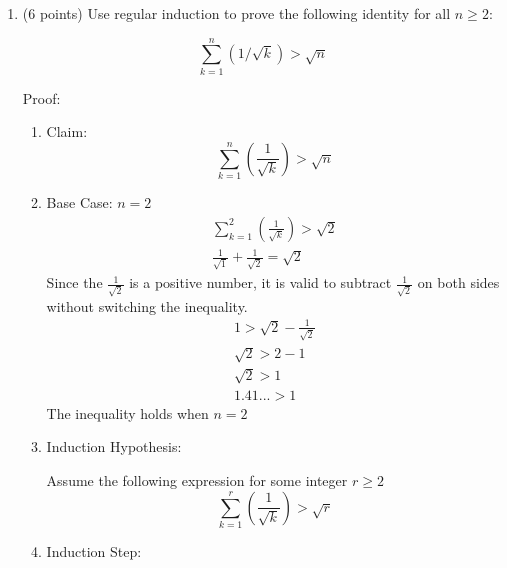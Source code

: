 \documentclass[10pt,letterpaper,unboxed,cm]{article}
\begin{document}
\begin{enumerate}
\begin{enumerate}
\begin{enumerate}
    
\end{enumerate}

\item (6 points)
Use regular induction to prove the following identity for all $n\geq 2$:

$$\sum_{k=1}^n \left(1/\sqrt{k}\right) > \sqrt{n}$$

Proof:
\begin{enumerate}
\item Claim: 
$$
\sum_{k=1}^{n}(\frac{1}{\sqrt{k}}) > \sqrt{n}
$$
\item Base Case: $n = 2$
\begin{align*}
    \sum_{k=1}^{2}(\frac{1}{\sqrt{k}}) >\sqrt{2}\\
    \frac{1}{\sqrt{1}} + \frac{1}{\sqrt{2}} = \sqrt{2}
\end{align*}
Since the $\frac{1}{\sqrt{2}}$ is a positive number, it is valid to subtract $\frac{1}{\sqrt{2}}$ on both sides without switching the inequality.
\begin{align*}
    1 > \sqrt{2}-\frac{1}{\sqrt{2}}\\
    \sqrt{2} > 2 - 1\\
    \sqrt{2} > 1\\
    1.41... > 1
\end{align*}
The inequality holds when $n = 2$
\item Induction Hypothesis:

Assume the following expression for some integer $r \geq 2$
$$
    \sum_{k=1}^{r}(\frac{1}{\sqrt{k}}) > \sqrt{r}
$$
\item Induction Step:



\end{enumerate}
\end{enumerate}
\end{enumerate}
\end{document}
